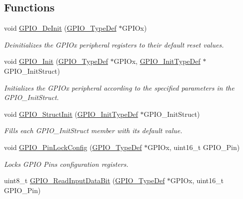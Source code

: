 \subsection*{Functions}
\begin{DoxyCompactItemize}
\item 
void \hyperlink{group___g_p_i_o_gaa60bdf3182c44b5fa818f237042f52ee}{G\+P\+I\+O\+\_\+\+De\+Init} (\hyperlink{struct_g_p_i_o___type_def}{G\+P\+I\+O\+\_\+\+Type\+Def} $\ast$G\+P\+I\+Ox)
\begin{DoxyCompactList}\small\item\em Deinitializes the G\+P\+I\+Ox peripheral registers to their default reset values. \end{DoxyCompactList}\item 
void \hyperlink{group___g_p_i_o_ga71abf9404261370d03cca449b88d3a65}{G\+P\+I\+O\+\_\+\+Init} (\hyperlink{struct_g_p_i_o___type_def}{G\+P\+I\+O\+\_\+\+Type\+Def} $\ast$G\+P\+I\+Ox, \hyperlink{struct_g_p_i_o___init_type_def}{G\+P\+I\+O\+\_\+\+Init\+Type\+Def} $\ast$G\+P\+I\+O\+\_\+\+Init\+Struct)
\begin{DoxyCompactList}\small\item\em Initializes the G\+P\+I\+Ox peripheral according to the specified parameters in the G\+P\+I\+O\+\_\+\+Init\+Struct. \end{DoxyCompactList}\item 
void \hyperlink{group___g_p_i_o_gab28de41278e7f8c63d0851e2733b10df}{G\+P\+I\+O\+\_\+\+Struct\+Init} (\hyperlink{struct_g_p_i_o___init_type_def}{G\+P\+I\+O\+\_\+\+Init\+Type\+Def} $\ast$G\+P\+I\+O\+\_\+\+Init\+Struct)
\begin{DoxyCompactList}\small\item\em Fills each G\+P\+I\+O\+\_\+\+Init\+Struct member with its default value. \end{DoxyCompactList}\item 
void \hyperlink{group___g_p_i_o_gad2f2e615928c69fd0d8c641a7cedaafc}{G\+P\+I\+O\+\_\+\+Pin\+Lock\+Config} (\hyperlink{struct_g_p_i_o___type_def}{G\+P\+I\+O\+\_\+\+Type\+Def} $\ast$G\+P\+I\+Ox, uint16\+\_\+t G\+P\+I\+O\+\_\+\+Pin)
\begin{DoxyCompactList}\small\item\em Locks G\+P\+IO Pins configuration registers. \end{DoxyCompactList}\item 
uint8\+\_\+t \hyperlink{group___g_p_i_o_ga98772ef6b639b3fa06c8ae5ba28d3aaa}{G\+P\+I\+O\+\_\+\+Read\+Input\+Data\+Bit} (\hyperlink{struct_g_p_i_o___type_def}{G\+P\+I\+O\+\_\+\+Type\+Def} $\ast$G\+P\+I\+Ox, uint16\+\_\+t G\+P\+I\+O\+\_\+\+Pin)

\end{DoxyCompactItemize}
